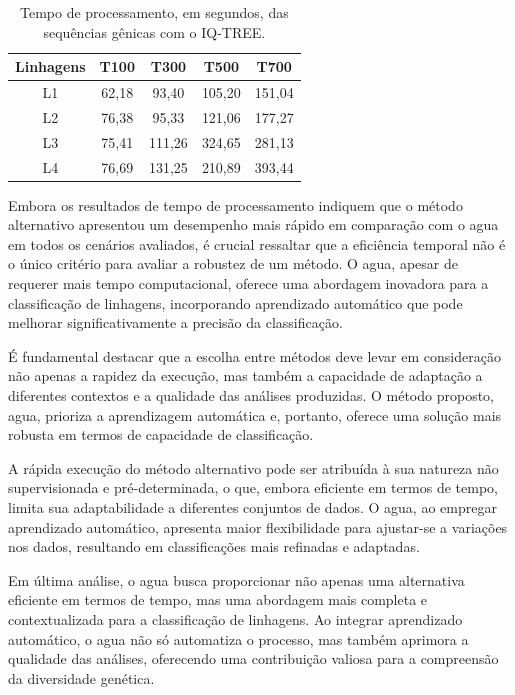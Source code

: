 \begin{table}[htb]
  \caption{Tempo de processamento, em segundos, das sequências gênicas com o IQ-TREE.}
  \begin{center}
    \begin{tabular}{c|c|c|c|c}
      \hline
      Linhagens & T100  & T300   & T500   & T700   \\
      \hline
      L1        & 62,18 & 93,40  & 105,20 & 151,04 \\
      L2        & 76,38 & 95,33  & 121,06 & 177,27 \\
      L3        & 75,41 & 111,26 & 324,65 & 281,13 \\
      L4        & 76,69 & 131,25 & 210,89 & 393,44 \\
      \hline
    \end{tabular}
  \end{center}
  \label{tab:tempoProcessamentoIqtree}
\end{table}

Embora os resultados de tempo de processamento indiquem que o método alternativo apresentou um desempenho mais rápido em comparação com o \gls{agua} em todos os cenários avaliados, é crucial ressaltar que a eficiência temporal não é o único critério para avaliar a robustez de um método. O \gls{agua}, apesar de requerer mais tempo computacional, oferece uma abordagem inovadora para a classificação de linhagens, incorporando aprendizado automático que pode melhorar significativamente a precisão da classificação.

É fundamental destacar que a escolha entre métodos deve levar em consideração não apenas a rapidez da execução, mas também a capacidade de adaptação a diferentes contextos e a qualidade das análises produzidas. O método proposto, \gls{agua}, prioriza a aprendizagem automática e, portanto, oferece uma solução mais robusta em termos de capacidade de classificação.

A rápida execução do método alternativo pode ser atribuída à sua natureza não supervisionada e pré-determinada, o que, embora eficiente em termos de tempo, limita sua adaptabilidade a diferentes conjuntos de dados. O \gls{agua}, ao empregar aprendizado automático, apresenta maior flexibilidade para ajustar-se a variações nos dados, resultando em classificações mais refinadas e adaptadas.

Em última análise, o \gls{agua} busca proporcionar não apenas uma alternativa eficiente em termos de tempo, mas uma abordagem mais completa e contextualizada para a classificação de linhagens. Ao integrar aprendizado automático, o \gls{agua} não só automatiza o processo, mas também aprimora a qualidade das análises, oferecendo uma contribuição valiosa para a compreensão da diversidade genética.

